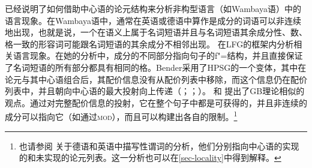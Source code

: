  \citet{Bender2008a}\label{Seite-Bender-Wambaya}已经说明了如何借助中心语的论元结构来分析非构型语言（如Wambaya语）中的语言现象。在Wambaya语中，通常在英语或德语中算作是成分的词语可以非连续地出现，也就是说，一个在语义上属于名词短语并且与名词短语其余成分性、数、格一致的形容词可能跟名词短语的其余成分不相邻出现。 \citet{Nordlinger98a-u}在LFG\indexlfgc 的框架内分析相关语言现象。在她的分析中，成分的不同部分指向句子的f"=结构，并且直接保证了名词短语的所有部分都具有相同的格。Bender采用了HPSG的一个变体，其中在论元与其中心语组合后，其配价信息没有从配价列表中移除，而这个信息仍在配价列表中，并且朝向中心语的最大投射向上传递（\citealp{Meurers99b}；\citealp{Prze99}；\citealp[\S~17.4]{MuellerLehrbuch1}）。 \citet[]{Higginbotham85a}和 \citet{Winkler97a}提出了GB理论相似的观点。通过对完整配价信息的投射，它在整个句子中都是可获得的，并且非连续的成分可以指向它（如通过\textsc{mod}），而且可以构建出各自的限制。\footnote{%
也请参阅 关于德语和英语中描写性谓词的分析，他们分别指向中心语的实现的和未实现的论元列表。这一分析也可以在\ref{sec-locality}中得到解释。
}  
